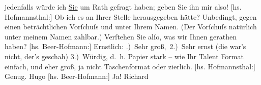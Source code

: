 \begin{ledgroupsized}[t]{13cm}
               jedenfalls würde ich \uline{Sie} um Rath gefragt haben; geben
               Sie ihn mir also!\pend
           \pstart
           {[}hs. Hofmannsthal:{]} Ob ich es an Ihrer Stelle herausgegeben hätte?
               Unbedingt, gegen einen beträchtlichen Vorſchuſs und unter Ihrem Namen. (Der Vorſchuſs
               natürlich unter meinem Namen zahlbar.)\pend
           \pstart
           Verſtehen Sie alſo, was wir Ihnen gerathen haben?\pend
           \pstart
           {[}hs. Beer-Hofmann:{]} Ernstlich:\pend
           \settowidth{\longeste}{1) Summe}\settowidth{\longestz}{entscheiden}\settowidth{\longestd}{}\settowidth{\longestv}{}\settowidth{\longestf}{}\addtolength\longeste{1em}
        \addtolength\longestz{1em}
      \pstart\noindent{}\makebox[\the\longestz][l]{}
                  \pend\pstart\noindent{}
                  \pend\pstart\noindent{}\makebox[\the\longestz][l]{}
                  \pend{}.) Sehr groß, 2.) Sehr ernst (die war’s nicht, der’s geschah) 3.) Würdig, d. h.
               Papier stark – wie Ihr Talent Format einfach, und eher groß, ja nicht Taschenformat
               oder zierlich.\pend
           \pstart
           {[}hs. Hofmannsthal:{]} Genug. \spacefill\mbox{Hugo}\pend
           \pstart
           {[}hs. Beer-Hofmann:{]} Ja! \spacefill\mbox{Richard}\pend
           \pstart
           \noindent{}\label{T_L01269-1v}\label{T_L01269-1h}\pend
           
         
         \endnumbering{}\end{ledgroupsized}  \newcommand{\dateiname}{L01269}\newcommand{\titel}{Hugo von Hofmannsthal und Richard Beer-Hofmann an Arthur Schnitzler, [15.? 2. 1903]}\newcommand{\editorInnen}{Martin Anton Müller und Gerd-Hermann Susen}
      